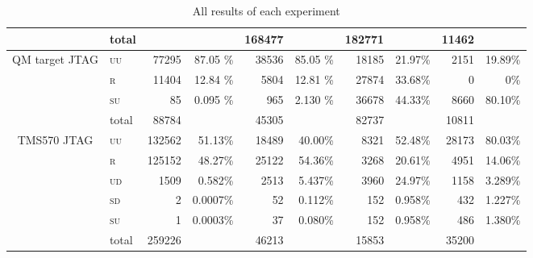 \documentclass[10pt]{article}
\newcommand{\TI}{TMS570\xspace}
\newcommand{\NXP}{QM target\xspace}
\newcommand{\jtag}{JTAG\xspace}
\newcommand{\UU}{\textsc{uu}\xspace}
\newcommand{\UD}{\textsc{ud}\xspace}
\newcommand{\SU}{\textsc{su}\xspace}
\newcommand{\SD}{\textsc{sd}\xspace}
\newcommand{\R}{\textsc{r}\xspace}
\begin{document}
\begin{appendices}
\begin{table}[H]
\begin{tabular}{ll rr rr rr rr}
    \cmidrule(l){2-10}
    & total    
    & & 
    & 168477  &                 
    & 182771  &          
    & 11462&           
    \\       


    \midrule

    \multicolumn{1}{c}{\multirow{3}{*}{ \parbox{2cm}{\NXP \jtag}}}

    & \UU    
    & 77295  & 87.05 \%               
    & 38536  & 85.05 \%            
    & 18185  & 21.97\%              
    & 2151   & 19.89\%               
    \\
    & \R   
    & 11404  & 12.84 \%               
    & 5804   & 12.81 \%            
    & 27874  & 33.68\%              
    & 0   & 0\%               
    \\
    & \SU      
    & 85     & 0.095 \%               
    & 965    & 2.130 \%            
    & 36678  & 44.33\%              
    & 8660   & 80.10\%               
    \\

    \cmidrule(l){2-10}
    & total    
    & 88784  &                        
    & 45305  &                     
    & 82737  &                        
    & 10811  &                        
    \\


    \midrule

    \multicolumn{1}{c}{\multirow{3}{*}{ \parbox{2cm}{\TI \jtag }}}
    & \UU    
    & 132562 & 51.13\%               
    & 18489   & 40.00\%            
    & 8321   & 52.48\%       
    & 28173  & 80.03\%             
    \\
    & \R   
    & 125152     & 48.27\%               
    & 25122   & 54.36\%            
    & 3268   & 20.61\%       
    & 4951   & 14.06\%             
    \\
    & \UD  
    & 1509       &  0.582\%                      
    & 2513    & 5.437\%            
    & 3960   & 24.97\%       
    & 1158   & 3.289\%             
    \\
    & \SD     
    & 2       &  0.0007\%                  
    & 52      & 0.112\%            
    & 152    & 0.958\%       
    & 432    & 1.227\%             
    \\
    & \SU      
    & 1      & 0.0003\%               
    & 37      & 0.080\%            
    & 152    & 0.958\%       
    & 486    & 1.380\%             
    \\

    \cmidrule(l){2-10}
    & total    
    & 259226 &                        
    & 46213 &                       
    & 15853 &                 
    & 35200 &                       
    \\
    \bottomrule
    \end{tabular}
    \caption{All results of each experiment}
    \label{tab:all-results}
  \end{table}


\end{appendices}
\end{document}
